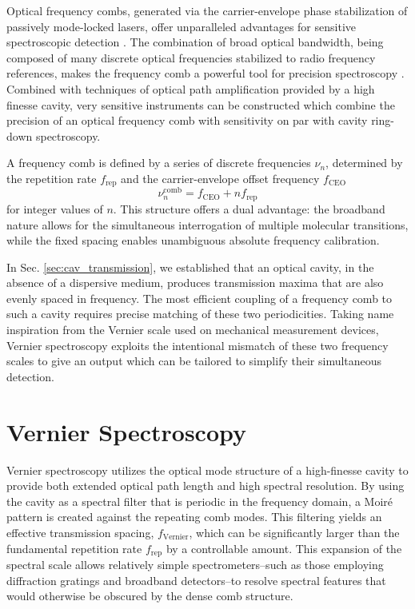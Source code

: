 \documentclass[8pt,a4paper]{report}
\begin{document}
	Optical frequency combs, generated via the carrier-envelope phase stabilization of passively mode-locked lasers, offer unparalleled advantages for sensitive spectroscopic detection \cite{book_ceas}. The combination of broad optical bandwidth, being composed of many discrete optical frequencies stabilized to radio frequency references, makes the frequency comb a powerful tool for precision spectroscopy \cite{book_yeCundifff_combs}. Combined with techniques of optical path amplification provided by a high finesse cavity, very sensitive instruments can be constructed which combine the precision of an optical frequency comb with sensitivity on par with cavity ring-down spectroscopy.
	
	A frequency comb is defined by a series of discrete frequencies $\nu_n$, determined by the repetition rate $f_{\text{rep}}$ and the carrier-envelope offset frequency $f_{\text{CEO}}$
	\begin{equation} \label{comb_modes}
		\nu^\mathrm{comb}_n = f_{\text{CEO}} + n f_{\text{rep}}
	\end{equation}
	for integer values of $n$. This structure offers a dual advantage: the broadband nature allows for the simultaneous interrogation of multiple molecular transitions, while the fixed spacing enables unambiguous absolute frequency calibration.
	
	In Sec. \ref{sec:cav_transmission}, we established that an optical cavity, in the absence of a dispersive medium, produces transmission maxima that are also evenly spaced in frequency. The most efficient coupling of a frequency comb to such a cavity requires precise matching of these two periodicities. Taking name inspiration from the Vernier scale used on mechanical measurement devices, Vernier spectroscopy exploits the intentional mismatch of these two frequency scales to give an output which can be tailored to simplify their simultaneous detection.
	
	\section{Vernier Spectroscopy}
	
	Vernier spectroscopy utilizes the optical mode structure of a high-finesse cavity to provide both extended optical path length and high spectral resolution. By using the cavity as a spectral filter that is periodic in the frequency domain, a Moiré pattern is created against the repeating comb modes. This filtering yields an effective transmission spacing, $f_{\text{Vernier}}$, which can be significantly larger than the fundamental repetition rate $f_{\text{rep}}$ by a controllable amount. This expansion of the spectral scale allows relatively simple spectrometers--such as those employing diffraction gratings and broadband detectors--to resolve spectral features that would otherwise be obscured by the dense comb structure.
	
\end{document}
